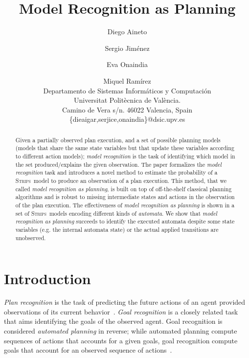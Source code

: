 \documentclass[letterpaper]{article} %
\newcommand{\strips}{\textsc{Strips}}     %
\begin{document}
\title{Model Recognition as Planning}

\author{Diego Aineto\and Sergio Jim\'enez\and Eva Onaindia \and Miquel Ram\'irez\\
{\small Departamento de Sistemas Inform\'aticos y Computaci\'on}\\
{\small Universitat Polit\`ecnica de Val\`encia.}\\
{\small Camino de Vera s/n. 46022 Valencia, Spain}\\
{\small \{dieaigar,serjice,onaindia\}@dsic.upv.es}}



\maketitle
\begin{abstract} 
Given a partially observed plan execution, and a set of possible planning models (models that share the same state variables but that update these variables according to different action models); {\em model recognition} is the task of identifying which model in the set produced/explains the given observation. The paper formalizes the {\em model recognition} task and introduces a novel method to estimate the probability of a \strips\ model to produce an observation of a plan execution. This method, that we called {\em model recognition as planning}, is built on top of off-the-shelf classical planning algorithms and is robust to missing intermediate states and actions in the observation of the plan execution. The effectiveness of {\em model recognition as planning} is shown in a set of \strips\ models encoding different kinds of {\em automata}. We show that {\em model recognition as planning} succeeds to identify the executed automata despite some state variables (e.g. the internal automata state) or the actual applied transitions are unobserved.
\end{abstract}

\section{Introduction}
\label{sec:introduction}
{\em Plan recognition} is the task of predicting the future actions of an agent provided observations of its current behavior~\cite{carberry2001techniques}. {\em Goal recognition} is a closely related task that aims identifying the goals of the observed agent. Goal recognition is considered {\em automated planning} in reverse; while automated planning compute sequences of actions that accounts for a given goals, goal recognition compute goals that account for an observed sequence of actions~\cite{geffner:book:2013}.
\end{document}
